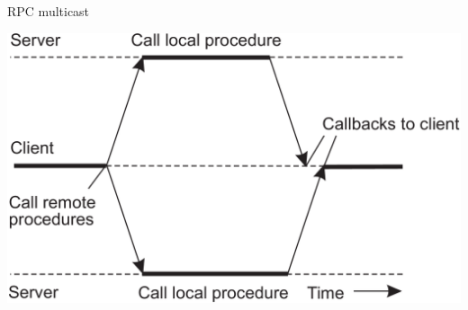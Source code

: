 \documentclass[compress]{beamer}
\begin{document}

\begin{frame}{RPC multicast}

\vspace{0.5cm}

\centering \includegraphics[width=\textwidth]{images/rpc_multicast.png}

\end{frame}
\end{document}
